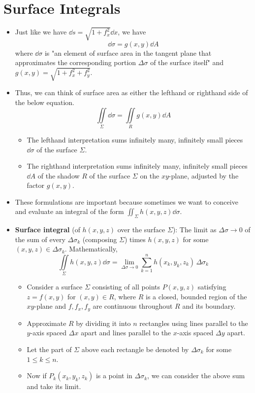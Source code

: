 \documentclass[../main.tex]{subfiles}
\begin{document}
\section{Surface Integrals}
\begin{itemize}
    \item {}Just like we have $\dd{s}=\sqrt{1+f_x^2}\dd{x}$, we have
    \begin{equation*}
        \dd{\sigma} = g(x,y)\dd{A}
    \end{equation*}
    where $\dd{\sigma}$ is "an element of surface area in the tangent plane that approximates the corresponding portion $\Delta\sigma$ of the surface itself" \parencite[581]{bib:Thomas} and $g(x,y)=\sqrt{1+f_x^2+f_y^2}$.
    \item Thus, we can think of surface area as either the lefthand or righthand side of the below equation.
    \begin{equation*}
        \iint\limits_\Sigma\dd{\sigma} = \iint\limits_Rg(x,y)\dd{A}
    \end{equation*}
    \begin{itemize}
        \item The lefthand interpretation sums infinitely many, infinitely small pieces $\dd{\sigma}$ of the surface $\Sigma$.
        \item The righthand interpretation sums infinitely many, infinitely small pieces $\dd{A}$ of the shadow $R$ of the surface $\Sigma$ on the $xy$-plane, adjusted by the factor $g(x,y)$.
    \end{itemize}
    \item These formulations are important because sometimes we want to conceive and evaluate an integral of the form $\iint_\Sigma h(x,y,z)\dd{\sigma}$.
    \item \textbf{Surface integral} (of $h(x,y,z)$ over the surface $\Sigma$): The limit as $\Delta\sigma\to 0$ of the sum of every $\Delta\sigma_k$ (composing $\Sigma$) times $h(x,y,z)$ for some $(x,y,z)\in\Delta\sigma_k$. Mathematically,
    \begin{equation*}
        \iint\limits_{\Sigma} h(x,y,z)\dd{\sigma} = \lim_{\Delta\sigma\to 0}\sum_{k=1}^nh(x_k,y_k,z_k)\, \Delta\sigma_k
    \end{equation*}
    \begin{itemize}
        \item Consider a surface $\Sigma$ consisting of all points $P(x,y,z)$ satisfying $z=f(x,y)$ for $(x,y)\in R$, where $R$ is a closed, bounded region of the $xy$-plane and $f,f_x,f_y$ are continuous throughout $R$ and its boundary.
        \item Approximate $R$ by dividing it into $n$ rectangles using lines parallel to the $y$-axis spaced $\Delta x$ apart and lines parallel to the $x$-axis spaced $\Delta y$ apart.
        \item Let the part of $\Sigma$ above each rectangle be denoted by $\Delta\sigma_k$ for some $1\leq k\leq n$.
        \item Now if $P_k(x_k,y_k,z_k)$ is a point in $\Delta\sigma_k$, we can consider the above sum and take its limit.
    \end{itemize}
\end{itemize}
\end{document}
